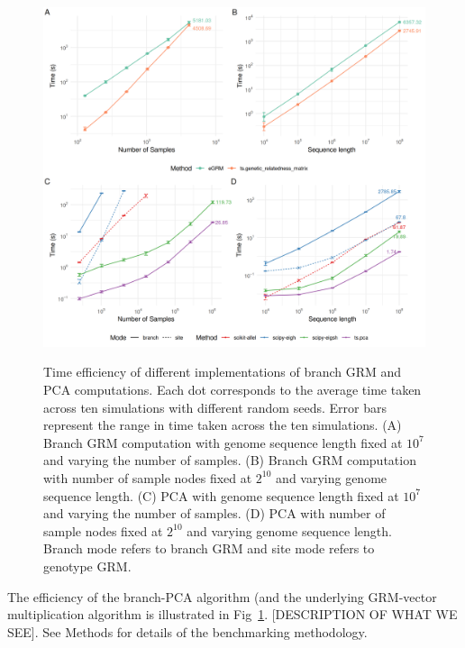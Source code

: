 \begin{figure}
    \centering
    \includegraphics[width=\textwidth]{Figures/Fig2_benchmarking_plot.png}
    \label{fig:benchmarking}
    \caption{Time efficiency of different implementations of branch GRM and PCA computations.
    Each dot corresponds to the average time taken across ten simulations with different random seeds.
    Error bars represent the range in time taken across the ten simulations.
    (A) Branch GRM computation with genome sequence length fixed at $10^{7}$ and varying the number of samples.
    (B) Branch GRM computation with number of sample nodes fixed at $2^{10}$ and varying genome sequence length.
    (C) PCA with genome sequence length fixed at $10^{7}$ and varying the number of samples.
    (D) PCA with number of sample nodes fixed at $2^{10}$ and varying genome sequence length.
    Branch mode refers to branch GRM and site mode refers to genotype GRM.}
\end{figure}


The efficiency of the branch-PCA algorithm (and the underlying GRM-vector
multiplication algorithm is illustrated in Fig~\ref{fig:benchmarking}. 
[DESCRIPTION OF WHAT WE SEE].
See Methods for details of the benchmarking methodology.


